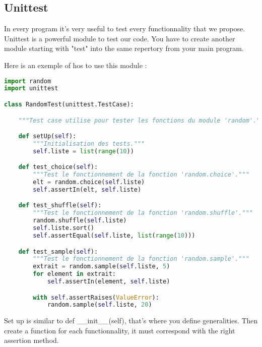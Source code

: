 \documentclass[a4paper, 12pt, titlepage]{scrartcl} %
\begin{document}
\subsection{Unittest}
In every program it's very useful to test every functionnality that we propose. Unittest is a powerful module to test our code. You have to create another module starting with "test" into the same repertory from your main program.

Here is an exemple of hos to use this module :
\begin{lstlisting}[language=Python]
import random
import unittest

class RandomTest(unittest.TestCase):

    """Test case utilise pour tester les fonctions du module 'random'."""

    def setUp(self):
        """Initialisation des tests."""
        self.liste = list(range(10))

    def test_choice(self):
        """Test le fonctionnement de la fonction 'random.choice'."""
        elt = random.choice(self.liste)
        self.assertIn(elt, self.liste)

    def test_shuffle(self):
        """Test le fonctionnement de la fonction 'random.shuffle'."""
        random.shuffle(self.liste)
        self.liste.sort()
        self.assertEqual(self.liste, list(range(10)))

    def test_sample(self):
        """Test le fonctionnement de la fonction 'random.sample'."""
        extrait = random.sample(self.liste, 5)
        for element in extrait:
            self.assertIn(element, self.liste)

        with self.assertRaises(ValueError):
            random.sample(self.liste, 20)
\end{lstlisting}
Set up is similar to def \_\_init\_\_(self), that's where you define generalities.
Then create a function for each functionnality, it must correspond with the right assertion method.
\end{document}
